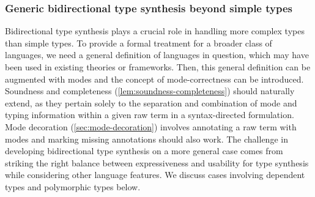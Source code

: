 %
%
\subsubsection{Generic bidirectional type synthesis beyond simple types}

Bidirectional type synthesis plays a crucial role in handling more complex types than simple types.
To provide a formal treatment for a broader class of languages, we need a general definition of languages in question, which may have been used in existing theories or frameworks.
Then, this general definition can be augmented with modes and the concept of mode-correctness can be introduced.
Soundness and completeness (\cref{lem:soundness-completeness}) should naturally extend, as they pertain solely to the separation and combination of mode and typing information within a given raw term in a syntax-directed formulation.
Mode decoration (\cref{sec:mode-decoration}) involves annotating a raw term with modes and marking missing annotations should also work.
The challenge in developing bidirectional type synthesis on a more general case comes from striking the right balance between expressiveness and usability for type synthesis while considering other language features.
We discuss cases involving dependent types and polymorphic types below.

